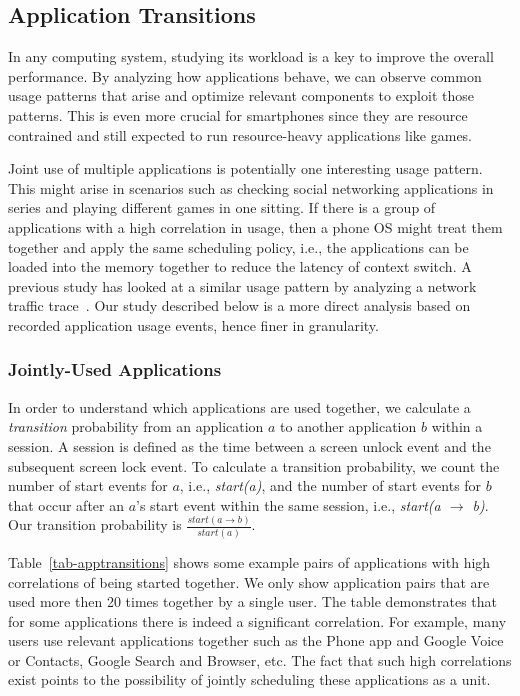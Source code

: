 \subsection{Application Transitions}
\label{subsec-apptransitions}



In any computing system, studying its workload is a key to improve the
overall performance. By analyzing how applications behave, we can observe
common usage patterns that arise and optimize relevant components to exploit
those patterns. This is even more crucial for smartphones since they are
resource contrained and still expected to run resource-heavy applications
like games.

Joint use of multiple applications is potentially one interesting usage pattern.
This might arise in scenarios such as checking social networking applications in
series and playing different games in one sitting. If there is a group of
applications with a high correlation in usage, then a phone OS might treat them
together and apply the same scheduling policy, i.e., the applications can be
loaded into the memory together to reduce the latency of context switch.
A previous study has looked at a similar usage pattern by analyzing a network
traffic trace~\cite{xu:imc:2011}. Our study described below is a more direct
analysis based on recorded application usage events, hence finer in granularity.

\subsubsection{Jointly-Used Applications}
In order to understand which applications are used together, we calculate a {\it
transition} probability from an application $a$ to another application $b$
within a session. A session is defined as the time between a screen unlock event
and the subsequent screen lock event. To calculate a transition probability, we
count the number of start events for $a$, i.e., {\it start(a)}, and the number
of start events for $b$ that occur after an $a$'s start event within the same
session, i.e., {\it start(a $\rightarrow$ b)}. Our transition probability is
$\frac{start(a \rightarrow b)}{start(a)}$.

Table~\ref{tab-apptransitions} shows some example pairs of applications with
high correlations of being started together. We only show application pairs that
are used more then 20 times together by a single user. The table demonstrates
that for some applications there is indeed a significant correlation.
For example, many users use relevant applications together such as the Phone app
and Google Voice or Contacts, Google Search and Browser, etc. The fact that such
high correlations exist points to the possibility of jointly scheduling these
applications as a unit.

